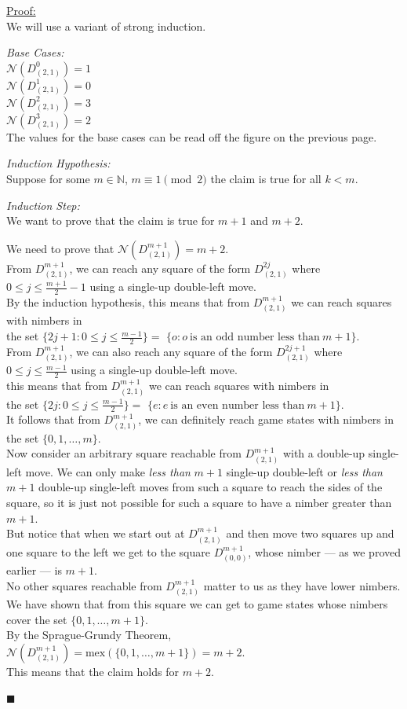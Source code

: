 \documentclass{article}
\newcommand{\N}{\mathbb{N}}
\newcommand{\I}[1]{\textit{#1}}
\newcommand{\T}[1]{\text{#1}}
\newcommand{\nim}{\mathcal{N}}
\newcommand{\D}[2]{D_{#1}^{#2}}
\newcommand{\SUDL}{single-up double-left}
\newenvironment{claimproof}[1]{\par\noindent\underline{Proof:}\space#1}
{\hfill $\blacksquare$}
\begin{document}
\begin{claimproof}\mbox{}\\
We will use a variant of strong induction.
\medskip

\I{Base Cases:} \\
$\nim(\D{(2,1)}{0}) = 1$ \\
$\nim(\D{(2,1)}{1}) = 0$ \\
$\nim(\D{(2,1)}{2}) = 3$ \\
$\nim(\D{(2,1)}{3}) = 2$ \\
The values for the base cases can be read off the
figure on the previous page.
\medskip

\I{Induction Hypothesis:} \\
Suppose for some $m \in \N$, $m \equiv 1 \pmod{2}$
the claim is true for all $k < m$.
\medskip

\I{Induction Step:} \\
We want to prove that the claim is true for $m + 1$ and $m + 2$.
\medskip

We need to prove that 
$\nim(\D{(2,1)}{m+1}) = m + 2$. \\
From $\D{(2,1)}{m+1}$, we can reach any square of the form
$\D{(2,1)}{2j}$ where $0 \leq j \leq \frac{m+1}{2}-1$ 
using a \SUDL{} move. \\
By the induction hypothesis,
this means that from $\D{(2,1)}{m+1}$ we can reach squares
with nimbers in \\ 
the set $\{2j+1 : 0 \leq j \leq \frac{m-1}{2}\} =$
$\{o : o\ \T{is an odd number less than}\ m+1\}$. \\
From $\D{(2,1)}{m+1}$, we can also reach any square of the form
$\D{(2,1)}{2j+1}$ where $0 \leq j \leq \frac{m-1}{2}$
using a \SUDL{} move. \\
this means that from $\D{(2,1)}{m+1}$ we can reach squares
with nimbers in \\ 
the set $\{2j : 0 \leq j \leq \frac{m-1}{2}\} =$
$\{e : e\ \T{is an even number less than}\ m+1\}$. \\
It follows that from $\D{(2,1)}{m+1}$, we can definitely
reach game states with nimbers in the set $\{0,1,\ldots,m\}$. \\
Now consider an arbitrary square reachable from $\D{(2,1)}{m+1}$
with a double-up single-left move. We can only make \I{less than}
$m+1$ single-up double-left or \I{less than} $m+1$ double-up single-left
moves from such a square to reach the sides of the square, so
it is just not possible for such a square to have a nimber
greater than $m+1$. \\
But notice that when we start out at $\D{(2,1)}{m+1}$ and then
move two squares up and one square to the left we get
to the square $\D{(0,0)}{m+1}$, whose nimber --- as we proved
earlier --- is $m+1$. \\
No other squares reachable from $\D{(2,1)}{m+1}$ matter to us as
they have lower nimbers. \\
We have shown that from this square we can get to game states
whose nimbers cover the set $\{0,1,\ldots,m+1\}$. \\
By the Sprague-Grundy Theorem, 
$\nim(\D{(2,1)}{m+1}) = \T{mex}(\{0,1,\ldots,m+1\}) = m + 2$. \\
This means that the claim holds for $m+2$.
\medskip


\end{claimproof}
\end{document}
